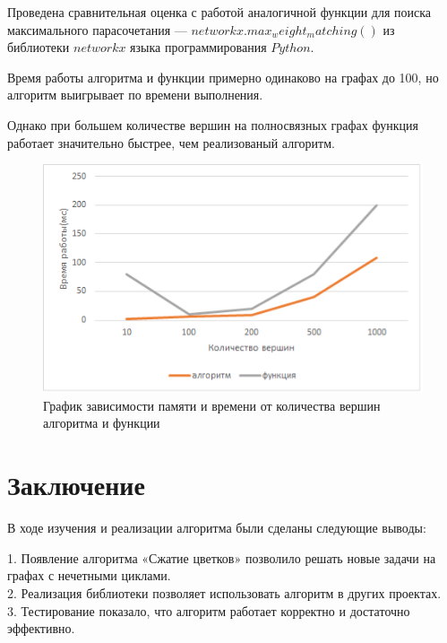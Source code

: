 \documentclass[14pt, a4paper]{extarticle}
\begin{document}
   Проведена сравнительная оценка с работой аналогичной функции для поиска максимального парасочетания --- $networkx.max_weight_matching()$ из библиотеки $networkx$ языка программирования $Python$.

   Время работы алгоритма и функции примерно одинаково на графах до 100, но алгоритм выигрывает по времени выполнения.
   
   Однако при большем количестве вершин на полносвязных графах функция работает значительно быстрее, чем реализованый алгоритм.

    \begin{figure}[h!]
        \centering
        \includegraphics[scale=0.55]{comparison.png}
        \caption{График зависимости памяти и времени от количества вершин алгоритма и функции}
        \label{fig:my_label}
    \end{figure} 
   
    
    \pagebreak
    
    \section*{Заключение}

    В ходе изучения и реализации алгоритма были сделаны следующие выводы:

    1. Появление алгоритма «Сжатие цветков» позволило решать новые задачи на графах с нечетными циклами.\\
    
    2. Реализация библиотеки позволяет использовать алгоритм в других проектах.\\

    3. Тестирование показало, что алгоритм работает корректно и достаточно эффективно.\\
\end{document}
